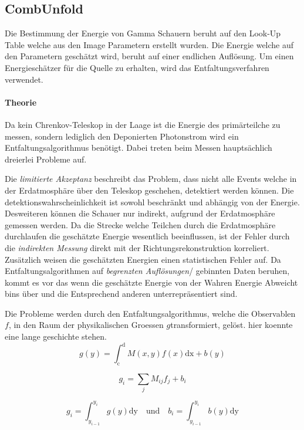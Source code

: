 \subsection{CombUnfold}%
\label{sub:combunfold}
Die Bestimmung der Energie von Gamma Schauern beruht auf den Look-Up Table
welche aus den Image Parametern erstellt wurden. 
Die Energie welche auf den Parametern geschätzt wird, beruht auf einer 
endlichen Auflösung.
Um einen Energieschätzer für die Quelle zu erhalten, 
wird das Entfaltungsverfahren verwendet.

\paragraph{Theorie}%
\label{par:theorie}
Da kein Chrenkov-Teleskop in der Laage ist die Energie 
des primärteilche zu messen,
sondern lediglich den Deponierten Photonstrom wird ein Entfaltungsalgorithmus
benötigt.
Dabei treten beim Messen hauptsächlich dreierlei Probleme auf.

Die \textit{limitierte Akzeptanz} beschreibt das Problem, 
dass nicht alle Events welche in der Erdatmosphäre über den Teleskop geschehen,
detektiert werden können. 
Die detektionswahrscheinlichkeit ist sowohl beschränkt 
und abhängig von der Energie.
Desweiteren können die Schauer nur indirekt, 
aufgrund der Erdatmosphäre gemessen werden.
Da die Strecke welche Teilchen durch die Erdatmosphäre durchlaufen die
geschätzte Energie wesentlich beeinflussen,
ist der Fehler durch die \textit{indirekten Messung} direkt mit der
Richtungsrekonstruktion korreliert.
Zusätzlich weisen die geschätzten Energien einen statistischen Fehler auf. 
Da Entfaltungsalgorithmen auf \textit{begrenzten Auflösungen}/ gebinnten Daten
beruhen, kommt es vor das wenn die geschätzte Energie von der Wahren Energie
Abweicht bins über und die Entsprechend anderen unterrepräsentiert sind.

Die Probleme werden durch den Entfaltungsalgorithmus,
welche die Observablen $f$,
in den Raum der physikalischen Groessen $g$transformiert,
gelöst.
hier koennte eine lange geschichte stehen.
\begin{equation}
	g(y) = \int_\text{c}^\text{d} M(x,y) f(x) \text{dx} + b(y)
\end{equation}

\begin{equation}
	g_i = \sum_j M_{ij} f_j + b_i
\end{equation}

\begin{equation}
	g_i = \int_{y_{i-1}}^{y_i} g(y) \text{dy} \quad \text{und} \quad
	b_i = \int_{y_{i-1}}^{y_i} b(y) \text{dy}
\end{equation}

